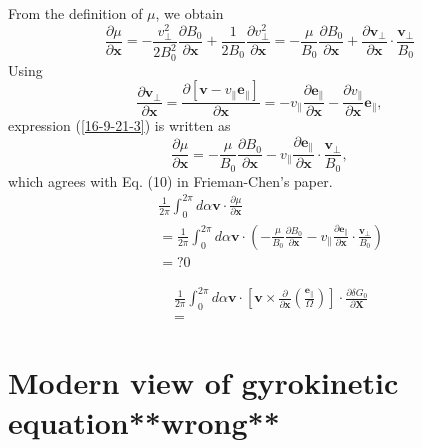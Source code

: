 \documentclass{llncs}
\newcommand{\tmmathbf}[1]{\ensuremath{\boldsymbol{#1}}}
\begin{document}
From the definition of $\mu$, we obtain
\begin{equation}
  \label{16-9-21-3} \frac{\partial \mu}{\partial \mathbf{x}} = -
  \frac{v_{\perp}^2}{2 B^2_0} \frac{\partial B_0}{\partial \mathbf{x}} +
  \frac{1}{2 B_0}  \frac{\partial v_{\perp}^2}{\partial \mathbf{x}} = -
  \frac{\mu}{B_0}  \frac{\partial B_0}{\partial \mathbf{x}} + \frac{\partial
  \mathbf{v}_{\perp}}{\partial \mathbf{x}} \cdot
  \frac{\mathbf{v}_{\perp}}{B_0}
\end{equation}
Using
\begin{equation}
  \frac{\partial \mathbf{v}_{\perp}}{\partial \mathbf{x}} = \frac{\partial
  [\mathbf{v}- v_{\parallel} \mathbf{e}_{\parallel}]}{\partial \mathbf{x}} = -
  v_{\parallel} \frac{\partial \mathbf{e}_{\parallel}}{\partial \mathbf{x}} -
  \frac{\partial v_{\parallel}}{\partial \mathbf{x}} \mathbf{e}_{\parallel},
\end{equation}
expression (\ref{16-9-21-3}) is written as
\begin{equation}
  \frac{\partial \mu}{\partial \mathbf{x}} = - \frac{\mu}{B_0}  \frac{\partial
  B_0}{\partial \mathbf{x}} - v_{\parallel} \frac{\partial
  \mathbf{e}_{\parallel}}{\partial \mathbf{x}} \cdot
  \frac{\mathbf{v}_{\perp}}{B_0},
\end{equation}
which agrees with Eq. (10) in Frieman-Chen's paper{\cite{frieman1982}}.
\begin{eqnarray*}
  &  & \frac{1}{2 \pi} \int_0^{2 \pi} d \alpha \mathbf{v} \cdot
  \frac{\partial \mu}{\partial \mathbf{x}}\\
  &  & = \frac{1}{2 \pi} \int_0^{2 \pi} d \alpha \mathbf{v} \cdot \left( -
  \frac{\mu}{B_0}  \frac{\partial B_0}{\partial \mathbf{x}} - v_{\parallel}
  \frac{\partial \mathbf{e}_{\parallel}}{\partial \mathbf{x}} \cdot
  \frac{\mathbf{v}_{\perp}}{B_0} \right)\\
  &  & = ? 0
\end{eqnarray*}

\begin{eqnarray*}
  &  & \frac{1}{2 \pi} \int_0^{2 \pi} d \alpha \mathbf{v} \cdot \left[
  \mathbf{v} \times \frac{\partial}{\partial \mathbf{x}} \left(
  \frac{\tmmathbf{e}_{\parallel}}{\Omega} \right) \right] \cdot \frac{\partial
  \delta G_0}{\partial \mathbf{X}}\\
  &  & =
\end{eqnarray*}

\part{Modern view of gyrokinetic equation**wrong**}
\end{document}

